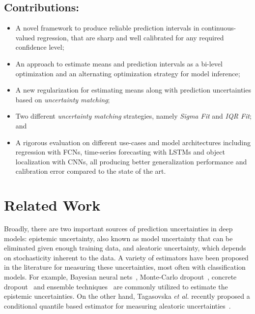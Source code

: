 \documentclass[letterpaper]{article} %
\begin{document}
\subsection{Contributions:}
\begin{itemize}
	\item A novel framework to produce reliable prediction intervals in continuous-valued regression, that are sharp and well calibrated for any required confidence level;
	\item An approach to estimate means and prediction intervals as a bi-level optimization and an alternating optimization strategy for model inference;
	\item A new regularization for estimating means along with prediction uncertainties based on \textit{uncertainty matching};
	\item Two different \textit{uncertainty matching} strategies, namely \textit{Sigma Fit} and \textit{IQR Fit}; and
	\item A rigorous evaluation on different use-cases and model architectures including regression with FCNs, time-series forecasting with LSTMs and object localization with CNNs, all producing better generalization performance and calibration error compared to the state of the art.
\end{itemize}

\section{Related Work}
Broadly, there are two important sources of prediction uncertainties in deep models: epistemic uncertainty, also known as model uncertainty that can be eliminated given enough training data, and aleatoric uncertainty, which depends on stochasticity inherent to the data. A variety of estimators have been proposed in the literature for measuring these uncertainties, most often with classification models. For example, Bayesian neural nets~\cite{blundell2015weight}, Monte-Carlo dropout~\cite{gal2016dropout}, concrete dropout~\cite{gal2017concrete} and  ensemble techniques~\cite{lakshminarayanan2017ensemble} are commonly utilized to estimate the epistemic uncertainties. On the other hand, Tagasovska \textit{et al.} recently proposed a conditional quantile based estimator for measuring aleatoric uncertainties~\cite{tagasovska2018frequentist}.
\end{document}
